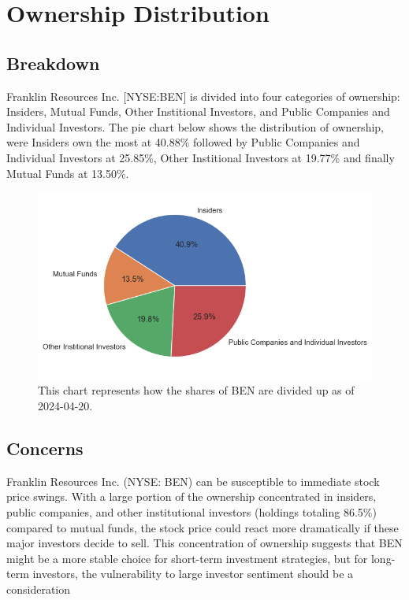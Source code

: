 \documentclass[9pt,a4paper,twoside]{tau}
\begin{document}
\section{Ownership Distribution}
    \subsection{Breakdown}
        Franklin Resources Inc. [NYSE:BEN] is divided into four categories of ownership: Insiders, Mutual Funds, Other Institional Investors, and Public Companies and Individual Investors. The pie chart below shows the distribution of ownership, were Insiders own the most at 40.88\% followed by Public Companies and Individual Investors at 25.85\%, Other Institional Investors at 19.77\% and finally Mutual Funds at 13.50\%.

            \begin{figure}[H]
                \centering
                \includegraphics[width=0.85\columnwidth]{images/OwnershipPieChart.png}
                \caption{This chart represents how the shares of BEN are divided up as of 2024-04-20.}
                \label{fig:figure}
            \end{figure}

    \subsection{Concerns}
    
        Franklin Resources Inc. (NYSE: BEN) can be susceptible to immediate stock price swings. With a large portion of the ownership concentrated in insiders, public companies, and other institutional investors (holdings totaling 86.5\%) compared to mutual funds, the stock price could react more dramatically if these major investors decide to sell.  This concentration of ownership suggests that BEN might be a more stable choice for short-term investment strategies, but for long-term investors, the vulnerability to large investor sentiment should be a consideration
\end{document}
